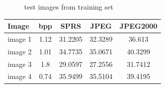 \begin{figure}[h]
\hspace{5mm}
\caption{test images from training set}
\label{fig:database_images}
\end{figure}

\begin{table}[H]
\centering
\begin{tabular}{| l c | c | c | c|}
\hline\hline
Image & bpp & SPRS & JPEG & JPEG2000 \\
\hline
image 1 & 1.12 & 31.2205 & 32.3289 & 36.613 \\
image 2 & 1.01 & 34.7735 & 35.0671 & 40.3299 \\
image 3 & 1.8  & 29.0597 & 27.2556 & 31.7412 \\
image 4 & 0.74  & 35.9499 & 35.5104 & 39.4195 \\

\hline
\end{tabular}
\end{table}

\begin{figure}[H]
\centering
{}
\hspace{5mm}
\hspace{5mm}
\end{figure}

